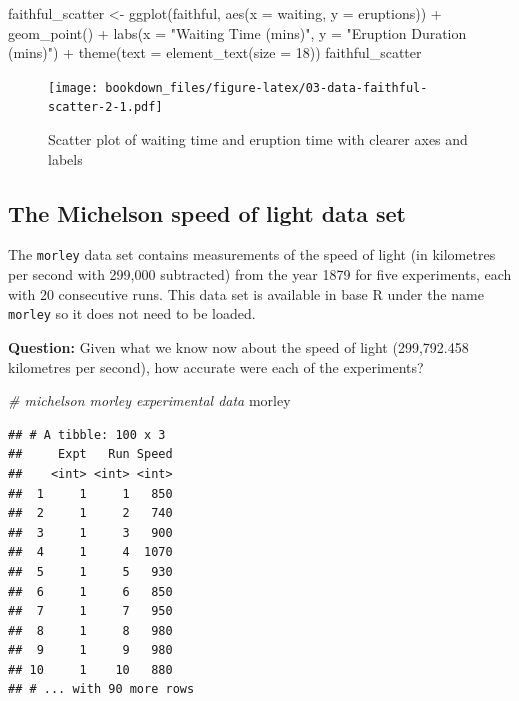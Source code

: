 \documentclass[
]{krantz}
\makeatletter
\newenvironment{Shaded}{\begin{snugshade}}{\end{snugshade}}
\newcommand{\AttributeTok}[1]{\textcolor[rgb]{0.61,0.61,0.61}{#1}}
\newcommand{\CommentTok}[1]{\textcolor[rgb]{0.37,0.37,0.37}{\textit{#1}}}
\newcommand{\DecValTok}[1]{\textcolor[rgb]{0.06,0.06,0.06}{#1}}
\newcommand{\FunctionTok}[1]{\textcolor[rgb]{0,0,0}{#1}}
\newcommand{\NormalTok}[1]{#1}
\newcommand{\OtherTok}[1]{\textcolor[rgb]{0.37,0.37,0.37}{#1}}
\newcommand{\SpecialCharTok}[1]{\textcolor[rgb]{0,0,0}{#1}}
\newcommand{\StringTok}[1]{\textcolor[rgb]{0.5,0.5,0.5}{#1}}
\newenvironment{kframe}{%
\medskip{}
\setlength{\fboxsep}{.8em}
 \def\at@end@of@kframe{}%
 \ifinner\ifhmode%
  \def\at@end@of@kframe{\end{minipage}}%
  \begin{minipage}{\columnwidth}%
 \fi\fi%
 \def\FrameCommand##1{\hskip\@totalleftmargin \hskip-\fboxsep
 \colorbox{shadecolor}{##1}\hskip-\fboxsep
     \hskip-\linewidth \hskip-\@totalleftmargin \hskip\columnwidth}%
 \MakeFramed {\advance\hsize-\width
   \@totalleftmargin\z@ \linewidth\hsize
   \@setminipage}}%
 {\par\unskip\endMakeFramed%
 \at@end@of@kframe}
\renewenvironment{Shaded}{\begin{kframe}}{\end{kframe}}
\makeatother
\begin{document}
\begin{Shaded}
\begin{Highlighting}[]
\NormalTok{faithful\_scatter }\OtherTok{\textless{}{-}} \FunctionTok{ggplot}\NormalTok{(faithful, }\FunctionTok{aes}\NormalTok{(}\AttributeTok{x =}\NormalTok{ waiting, }\AttributeTok{y =}\NormalTok{ eruptions)) }\SpecialCharTok{+}
  \FunctionTok{geom\_point}\NormalTok{() }\SpecialCharTok{+}
  \FunctionTok{labs}\NormalTok{(}\AttributeTok{x =} \StringTok{"Waiting Time (mins)"}\NormalTok{, }\AttributeTok{y =} \StringTok{"Eruption Duration (mins)"}\NormalTok{) }\SpecialCharTok{+}
  \FunctionTok{theme}\NormalTok{(}\AttributeTok{text =} \FunctionTok{element\_text}\NormalTok{(}\AttributeTok{size =} \DecValTok{18}\NormalTok{))}
\NormalTok{faithful\_scatter}
\end{Highlighting}
\end{Shaded}

\begin{figure}
\centering
\texttt{[image: bookdown\_files/figure-latex/03-data-faithful-scatter-2-1.pdf]}
\caption{\label{fig:03-data-faithful-scatter-2}Scatter plot of waiting time and eruption time with clearer axes and labels}
\end{figure}

\hypertarget{the-michelson-speed-of-light-data-set}{%
\subsection{The Michelson speed of light data set}\label{the-michelson-speed-of-light-data-set}}

The \texttt{morley} data set contains measurements of the speed of light (in kilometres per second with 299,000 subtracted) from the year 1879
for five experiments, each with 20 consecutive runs. This data set is available in base R under the name \texttt{morley} so it does not need to be loaded.

\textbf{Question:} Given what we know now about the speed of
light (299,792.458 kilometres per second), how accurate were each of the experiments?

\begin{Shaded}
\begin{Highlighting}[]
\CommentTok{\# michelson morley experimental data}
\NormalTok{morley}
\end{Highlighting}
\end{Shaded}

\begin{verbatim}
## # A tibble: 100 x 3
##     Expt   Run Speed
##    <int> <int> <int>
##  1     1     1   850
##  2     1     2   740
##  3     1     3   900
##  4     1     4  1070
##  5     1     5   930
##  6     1     6   850
##  7     1     7   950
##  8     1     8   980
##  9     1     9   980
## 10     1    10   880
## # ... with 90 more rows
\end{verbatim}
\end{document}
